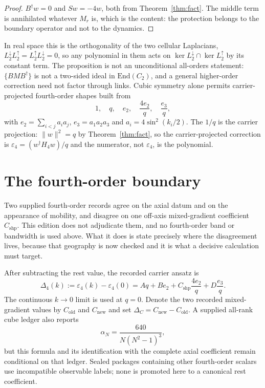 \documentclass[11pt]{article}
\theoremstyle{plain}
\theoremstyle{definition}
\theoremstyle{remark}
\newcommand{\chk}[1]{}
\newcommand{\dg}{^{\dagger}}
\begin{document}
\begin{proof}
$B\dg w=0$ and $Sw=-4w$, both from Theorem~\ref{thm:fact}. The middle term is
annihilated whatever $M_r$ is, which is the content: the protection belongs to
the boundary operator and not to the dynamics.
\end{proof}
\chk{a boundary-factorised correction shifts the carrier without dispersing it, for generic M}

In real space this is the orthogonality of the two cellular Laplacians,
$L^{\downarrow}_2L^{\uparrow}_2=L^{\uparrow}_2L^{\downarrow}_2=0$, so any
polynomial in them acts on $\ker L^{\downarrow}_2\cap\ker L^{\uparrow}_2$ by
its constant term. The proposition is not an unconditional all-orders
statement: $\{BMB\dg\}$ is not a two-sided ideal in $\mathrm{End}(C_2)$, and a
general higher-order correction need not factor through links. Cubic symmetry
alone permits carrier-projected fourth-order shapes built from
\begin{equation}\label{eq:shapes}
  1,\quad q,\quad e_2,\quad \frac{4e_2}{q},\quad \frac{e_3}{q},
\end{equation}
with $e_2=\sum_{i<j}a_ia_j$, $e_3=a_1a_2a_3$ and $a_i=4\sin^2(k_i/2)$. The
$1/q$ is the carrier projection: $\|w\|^2=q$ by Theorem~\ref{thm:fact}, so the
carrier-projected correction is $\varepsilon_4=(w\dg H_4w)/q$ and the
numerator, not $\varepsilon_4$, is the polynomial.
\chk{the carrier projection is where the 1/q comes from}
\chk{clearing the denominator reproduces the five-element numerator basis}

\section{The fourth-order boundary}
\label{sec:fourth}

Two supplied fourth-order records agree on the axial datum and on the
appearance of mobility, and disagree on one off-axis mixed-gradient
coefficient $C_{\mathrm{shp}}$. This edition does not adjudicate them, and no
fourth-order band or bandwidth is used above. What it does is state precisely
where the disagreement lives, because that geography is now checked and it is
what a decisive calculation must target.

After subtracting the rest value, the recorded carrier ansatz is
\begin{equation}\label{eq:shapeansatz}
 \Delta_4(k):=\varepsilon_4(k)-\varepsilon_4(0)
 =Aq+Be_2+C_{\mathrm{shp}}\frac{4e_2}{q}
   +D\frac{e_3}{q}.
\end{equation}
The continuous $k\to0$ limit is used at $q=0$. Denote the two recorded
mixed-gradient values by $C_{\mathrm{old}}$ and $C_{\mathrm{new}}$ and set
$\Delta_C=C_{\mathrm{new}}-C_{\mathrm{old}}$. A supplied all-rank cube ledger
also reports
\begin{equation}\label{eq:alphaN}
 \alpha_N=\frac{640}{N(N^2-1)^3},
\end{equation}
but this formula and its identification with the complete axial coefficient
remain conditional on that ledger. Sealed packages containing other
fourth-order scalars use incompatible observable labels; none is promoted here
to a canonical rest coefficient.
\end{document}
